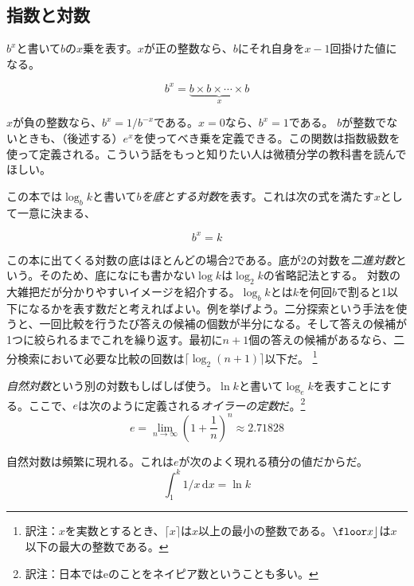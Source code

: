 \subsection{指数と対数}

$b^x$と書いて$b$の$x$乗を表す。$x$が正の整数なら、$b$にそれ自身を$x-1$回掛けた値になる。

\[
    b^x = \underbrace{b\times b\times \cdots \times b}_{x}
\]

$ x $が負の整数なら、$b^x=1/b^{-x}$である。$x=0$なら、$b^x=1$である。
$b$が整数でないときも、（後述する）$e^x$を使ってべき乗を定義できる。この関数は指数級数を使って定義される。こういう話をもっと知りたい人は微積分学の教科書を読んでほしい。

この本では$\log_b k$と書いて\emph{$b$を底とする対数}を表す。これは次の式を満たす$x$として一意に決まる、

\[
    b^{x} = k
\]

この本に出てくる対数の底はほとんどの場合2である。底が2の対数を\emph{二進対数}という。そのため、底になにも書かない$\log k$は$\log_2 k$の省略記法とする。
%
%
対数の大雑把だが分かりやすいイメージを紹介する。$\log_b k$とは$k$を何回$b$で割ると1以下になるかを表す数だと考えればよい。例を挙げよう。二分探索という手法を使うと、一回比較を行うたび答えの候補の個数が半分になる。そして答えの候補が1つに絞られるまでこれを繰り返す。最初に$n+1$個の答えの候補があるなら、二分検索において必要な比較の回数は$\lceil \log_2(n+1) \rceil$以下だ。
\footnote{訳注：$x$を実数とするとき、$\lceil x \rceil$は$x$以上の最小の整数である。$\floor x \rfloor$は$x$以下の最大の整数である。}

%
%
\emph{自然対数}という別の対数もしばしば使う。$\ln k$と書いて$\log_e k$を表すことにする。ここで、$e$は次のように定義される\emph{オイラーの定数}だ。\footnote{訳注：日本ではeのことをネイピア数ということも多い。}
%
%
\[
   e = \lim_{n\rightarrow\infty} \left(1+\frac{1}{n}\right)^n
   \approx  2.71828
\]

自然対数は頻繁に現れる。これは$e$が次のよく現れる積分の値だからだ。
\[
    \int_{1}^{k} 1/x\,\mathrm{d}x  = \ln k
\]

